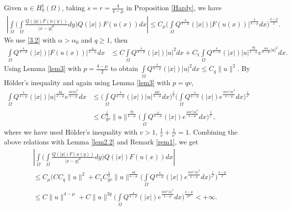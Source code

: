 \documentclass[11pt]{amsart}
\numberwithin{equation}{section}
\newcommand{\h}{H^1_0(\Omega)}
\newcommand{\1}{\frac{1}{2}}
\begin{document}
	Given $u \in \h$, taking $s=r= \frac{4}{4-\mu}$ in Proposition \ref{Hardy}, we have
	\begin{align}
		\left| \int\limits_\Omega \Bigg( \int\limits_\Omega \frac{Q(|y|)F(u(y))}{|x-y|^\mu} dy\Bigg) Q(|x|)F(u(x))dx \right| 
		\leq C_\mu\Bigg( \int\limits_{\Omega} Q^{\frac{4}{4-\mu}}(|x|)|F(u(x))|^{\frac{4}{4-\mu}} dx \Bigg)^{\frac{4-\mu}{2}}. \nonumber
	\end{align}
	We use \eqref{3.2} with $\alpha> \alpha_0$ and $q \geq 1$, then
	\begin{align}
		\int\limits_{\Omega} Q^{\frac{4}{4-\mu}}(|x|)|F(u(x))|^{\frac{4}{4-\mu}} dx & \leq C\int\limits_{\Omega} Q^{\frac{4}{4-\mu}}(|x|)|u|^2 dx + C_1\int\limits_\Omega Q^{\frac{4}{4-\mu}}(|x|)|u|^{\frac{4q}{4-\mu}} e^{\frac{4 \alpha}{4-\mu} |u|^2} dx. \nonumber
	\end{align}
	Using Lemma \ref{lem3} with $p=\frac{4-\mu}{2}$ to obtain $\int\limits_{\Omega} Q^{\frac{4}{4-\mu}}(|x|)|u|^2 dx \leq C_q\|u\|^2$.
	By H\"older's inequality and again using Lemma \ref{lem3} with $p=qv$, 
	\begin{align} 
		\int\limits_{\Omega} Q^{\frac{4}{4-\mu}}(|x|)|u|^{\frac{4q}{4-\mu}} e^{\frac{4\alpha |u|^2}{4-\mu}} dx  &\leq \Bigg(\int\limits_{\Omega} Q^{\frac{4}{4-\mu}}(|x|)|u|^{\frac{4qv}{4-\mu}} dx\Bigg)^{\frac{1}{v}} \Bigg( \int\limits_\Omega Q^{\frac{4}{4-\mu}}(|x|)e^{\frac{4\alpha v'|u|^2 }{4-\mu}} dx\Bigg)^{\frac{1}{v'}} \nonumber\\
		& \leq C_{qv}^{\1} \|u\|^{\frac{4q}{4-\mu}} \Bigg( \int\limits_\Omega Q^{\frac{4}{4-\mu}}(|x|)e^{\frac{4\alpha v'|u|^2}{4-\mu}}dx\Bigg)^{\frac{1}{v'}},\nonumber
	\end{align}
	where we have used H\"older's inequality with $v>1$, $\frac{1}{v} + \frac{1}{v'} = 1$. Combining the above relations with Lemma \ref{lem2.2} and Remark \ref{rem1}, we get 
	\begin{align}
		&\left| \int\limits_\Omega \Bigg( \int\limits_\Omega \frac{Q(|y|)F(u(y))}{|x-y|^\mu} dy\Bigg) Q(|x|)F(u(x))dx \right| \nonumber\\
		& \leq C_\mu \Bigg( C C_q \|u\|^2+ C_1 C_{qv}^{\1} \|u\|^{\frac{4q}{4-\mu}} \Bigg( \int\limits_\Omega Q^{\frac{4}{4-\mu}}(|x|)e^{\frac{4\alpha v'|u|^2}{4-\mu}}dx\Bigg)^{\frac{1}{v'}} \Bigg)^{\frac{4-\mu}{2}} \nonumber \\
		& \leq C \|u\|^{4-\mu} + C \|u\|^{2q} \Bigg( \int\limits_\Omega Q^{\frac{4}{4-\mu}}(|x|)e^{\frac{4\alpha v'|u|^2}{4-\mu}}dx\Bigg)^{\frac{4-\mu}{2v'}} <+\infty \nonumber.
	\end{align}
\end{document}
